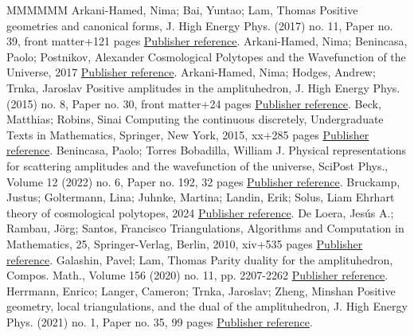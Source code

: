 \begin{thebibliography}{MMMMMM}
 Arkani-Hamed, Nima; Bai, Yuntao; Lam, Thomas Positive geometries and canonical forms, J. High Energy Phys. (2017) no. 11, Paper no. 39, front matter+121 pages \href{https://alco.centre-mersenne.org/articles/10.5802/alco.430/#arkani2017positive}{Publisher reference}.
 Arkani-Hamed, Nima; Benincasa, Paolo; Postnikov, Alexander Cosmological Polytopes and the Wavefunction of the Universe, 2017 \href{https://alco.centre-mersenne.org/articles/10.5802/alco.430/#arkani2017cosmological}{Publisher reference}.
 Arkani-Hamed, Nima; Hodges, Andrew; Trnka, Jaroslav Positive amplitudes in the amplituhedron, J. High Energy Phys. (2015) no. 8, Paper no. 30, front matter+24 pages \href{https://alco.centre-mersenne.org/articles/10.5802/alco.430/#arkani2015positive}{Publisher reference}.
 Beck, Matthias; Robins, Sinai Computing the continuous discretely, Undergraduate Texts in Mathematics, Springer, New York, 2015, xx+285 pages \href{https://alco.centre-mersenne.org/articles/10.5802/alco.430/#ccd}{Publisher reference}.
 Benincasa, Paolo; Torres Bobadilla, William J. Physical representations for scattering amplitudes and the wavefunction of the universe, SciPost Phys., Volume 12 (2022) no. 6, Paper no. 192, 32 pages \href{https://alco.centre-mersenne.org/articles/10.5802/alco.430/#benincasa2022physical}{Publisher reference}.
 Bruckamp, Justus; Goltermann, Lina; Juhnke, Martina; Landin, Erik; Solus, Liam Ehrhart theory of cosmological polytopes, 2024 \href{https://alco.centre-mersenne.org/articles/10.5802/alco.430/#bruckamp2024ehrhart}{Publisher reference}.
 De Loera, Jesús A.; Rambau, Jörg; Santos, Francisco Triangulations, Algorithms and Computation in Mathematics, 25, Springer-Verlag, Berlin, 2010, xiv+535 pages \href{https://alco.centre-mersenne.org/articles/10.5802/alco.430/#DRS}{Publisher reference}.
 Galashin, Pavel; Lam, Thomas Parity duality for the amplituhedron, Compos. Math., Volume 156 (2020) no. 11, pp. 2207-2262 \href{https://alco.centre-mersenne.org/articles/10.5802/alco.430/#galashin2020parity}{Publisher reference}.
 Herrmann, Enrico; Langer, Cameron; Trnka, Jaroslav; Zheng, Minshan Positive geometry, local triangulations, and the dual of the amplituhedron, J. High Energy Phys. (2021) no. 1, Paper no. 35, 99 pages \href{https://alco.centre-mersenne.org/articles/10.5802/alco.430/#herrmann2021positive}{Publisher reference}.

\end{thebibliography}
